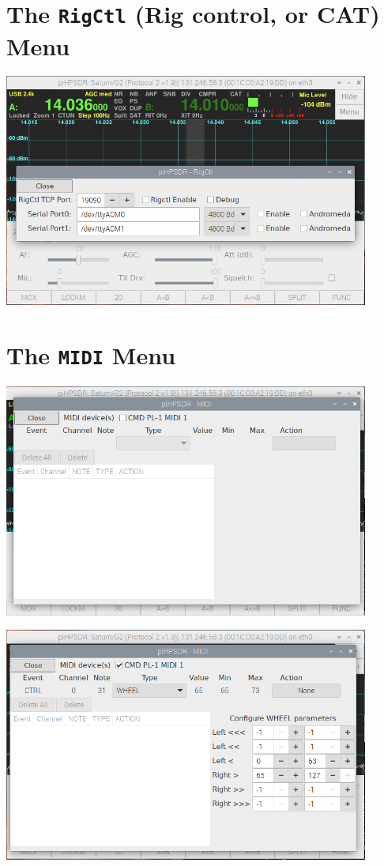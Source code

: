 \documentclass[12pt]{book}
\begin{document}
\section{The \texttt{RigCtl} (Rig control, or CAT) Menu}
\begin{center}
\includegraphics[width=12cm]{RigCtlMenu.png}
\end{center}

\section{The \texttt{MIDI} Menu}
\begin{center}
\includegraphics[width=12cm]{MIDImenu1.png}
\end{center}

\begin{center}
\includegraphics[width=12cm]{MIDImenu2.png}
\end{center}
\end{document}
